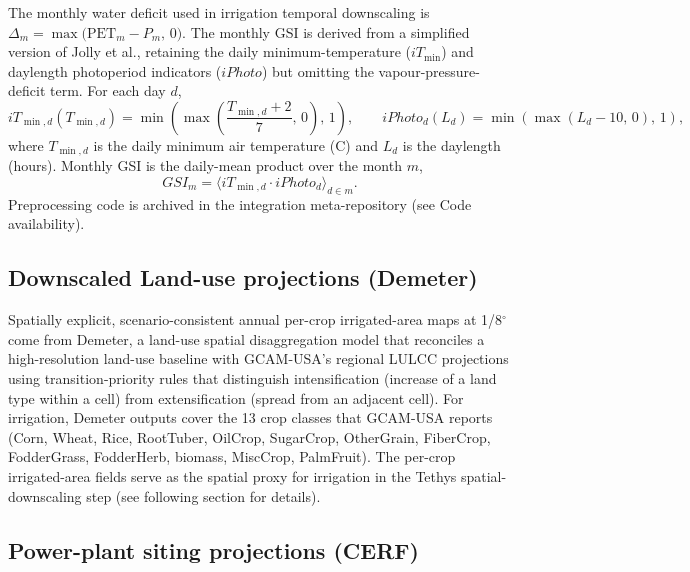 \documentclass[fleqn,10pt]{wlscirep}
\begin{document}
The monthly water deficit used in irrigation temporal downscaling is $\Delta_m = \max\!\big(\text{PET}_m - P_m,\, 0\big)$. The monthly GSI is derived from a simplified version of Jolly et al.\cite{Jolly_2005}, retaining the daily minimum-temperature ($iT_{\min}$) and daylength photoperiod indicators ($iPhoto$) but omitting the vapour-pressure-deficit term. For each day $d$,
\begin{equation}
iT_{\min,d}(T_{\min,d}) = \min\!\left(\max\!\left(\frac{T_{\min,d}+2}{7},\,0\right),\,1\right), \qquad
iPhoto_d(L_d) = \min\!\left(\max\!\left(L_d - 10,\,0\right),\,1\right),
\label{eq:gsi-components}
\end{equation}
where $T_{\min,d}$ is the daily minimum air temperature (\textdegree C) and $L_d$ is the daylength (hours). Monthly GSI is the daily-mean product over the month $m$,
\begin{equation}
GSI_m = \big\langle iT_{\min,d} \cdot iPhoto_d \big\rangle_{d \in m}.
\label{eq:gsi-monthly}
\end{equation}
Preprocessing code is archived in the integration meta-repository (see Code availability).

\subsection*{Downscaled Land-use projections (Demeter)}

Spatially explicit, scenario-consistent annual per-crop irrigated-area maps at 1/8$^{\circ}$ come from Demeter\cite{Vernon-2018}, a land-use spatial disaggregation model that reconciles a high-resolution land-use baseline with GCAM-USA's regional LULCC projections using transition-priority rules that distinguish intensification (increase of a land type within a cell) from extensification (spread from an adjacent cell). For irrigation, Demeter outputs cover the 13 crop classes that GCAM-USA reports (Corn, Wheat, Rice, RootTuber, OilCrop, SugarCrop, OtherGrain, FiberCrop, FodderGrass, FodderHerb, biomass, MiscCrop, PalmFruit). The per-crop irrigated-area fields serve as the spatial proxy for irrigation in the Tethys spatial-downscaling step (see following section for details).

\subsection*{Power-plant siting projections (CERF)\label{sec:cerf}}
\end{document}
